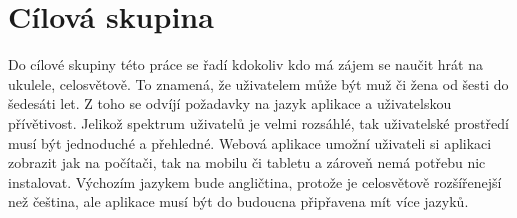 \section{Cílová skupina}
\label{sc:target_audience}
Do cílové skupiny této práce se řadí kdokoliv kdo má zájem se naučit hrát na ukulele, celosvětově. To znamená, že uživatelem může být muž či žena od šesti do šedesáti let. Z toho se odvíjí požadavky na jazyk aplikace a uživatelskou přívětivost. Jelikož spektrum uživatelů je velmi rozsáhlé, tak uživatelské prostředí musí být jednoduché a přehledné. Webová aplikace umožní uživateli si aplikaci zobrazit jak na počítači, tak na mobilu či tabletu a zároveň nemá potřebu nic instalovat. Výchozím jazykem bude angličtina, protože je celosvětově rozšířenejší než čeština, ale aplikace musí být do budoucna připřavena mít více jazyků.
